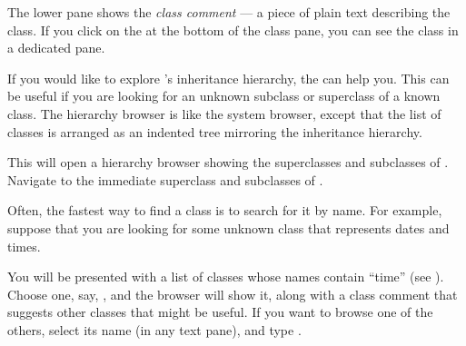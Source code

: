 \documentclass[a4paper,10pt,twoside]{book}
\begin{document}
The lower pane shows the \emph{class comment} --- a piece of plain text describing the class.
If you click on the  at the bottom of the class pane, you can see the class  in a dedicated pane.

If you would like to explore \sq's inheritance hierarchy, the  can help you.  
This can be useful if you are looking for an unknown subclass or superclass of a known class.
The hierarchy browser is like the system browser, except that the list of classes is arranged as an indented tree mirroring the inheritance hierarchy.

\noindent
This will open a hierarchy browser showing the superclasses and subclasses of .
Navigate to the immediate superclass and subclasses of .

Often, the fastest way to find a class is to search for it by name.  For example, suppose that you are looking for some unknown class that represents dates and times.

\noindent
You will be presented with a list of classes whose names contain ``time'' (see ).  Choose one, say, , and the browser will show it, along with a class comment that suggests other classes that might be useful.  If you want to browse one of the others, select its name (in any text pane), and type .
\end{document}
